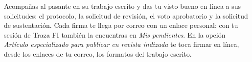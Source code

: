 \documentclass[11pt,a4paper]{article}
\begin{document}
{\small\tableofcontents}
\newpage
\begin{quevasahacer}
Acompañas al pasante en su trabajo escrito y das tu visto bueno en línea a sus solicitudes: el protocolo, la solicitud de revisión, el voto aprobatorio y la solicitud de sustentación. Cada firma te llega por correo con un enlace personal; con tu sesión de Traza FI también la encuentras en \emph{Mis pendientes}. En la opción \emph{Artículo especializado para publicar en revista indizada} te toca firmar en línea, desde los enlaces de tu correo, los formatos del trabajo escrito.
\end{quevasahacer}



\end{document}
